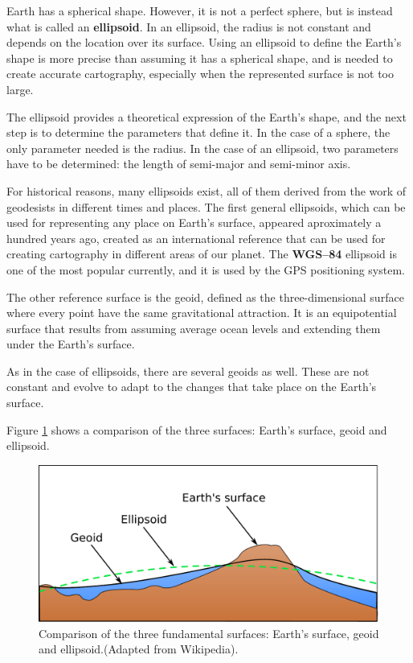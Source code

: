 Earth has a spherical shape. However, it is not a perfect sphere, but is instead what is called an \textbf{ellipsoid}. In an ellipsoid, the radius is not constant and depends on the location over its surface. Using an ellipsoid to define the Earth's shape is more precise than assuming it has a spherical shape, and is needed to create accurate cartography, especially when the represented surface is not too large.

The ellipsoid provides a theoretical expression of the Earth's shape, and the next step is to determine the parameters that define it. In the case of a sphere, the only parameter needed is the radius. In the case of an ellipsoid, two parameters have to be determined: the length of semi-major and semi-minor axis.

For historical reasons, many ellipsoids exist, all of them derived from the work of geodesists in different times and places. The first general ellipsoids, which can be used for representing any place on Earth's surface, appeared aproximately a hundred years ago, created as an international reference that can be used for creating cartography in different areas of our planet. The \textbf{WGS--84} ellipsoid is one of the most popular currently, and it is used by the GPS positioning system. 


The other reference surface is the geoid, defined as the three-dimensional surface where every point have the same gravitational attraction. It is an equipotential surface that results from assuming average ocean levels and extending them under the Earth's surface.

As in the case of ellipsoids, there are several geoids as well. These are not constant and evolve to adapt to the changes that take place on the Earth's surface.

Figure  \ref{Fig:Three_surfaces} shows a comparison of the three surfaces: Earth's surface, geoid and ellipsoid.

\begin{figure}
\centering
\includegraphics[width=.7\columnwidth]{Cartography/Three_surfaces.pdf}
\caption{\small Comparison of the three fundamental surfaces: Earth's surface, geoid and ellipsoid.(Adapted from Wikipedia).}
\label{Fig:Three_surfaces} 
\end{figure}

